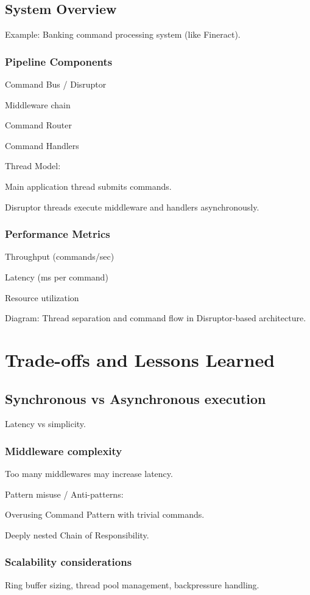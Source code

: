 \documentclass{article}
\begin{document}
\subsection{System Overview}
Example: Banking command processing system (like Fineract).

\subsubsection{Pipeline Components}

Command Bus / Disruptor

Middleware chain

Command Router

Command Handlers

Thread Model:

Main application thread submits commands.

Disruptor threads execute middleware and handlers asynchronously.

\subsubsection{Performance Metrics}

Throughput (commands/sec)

Latency (ms per command)

Resource utilization

Diagram: Thread separation and command flow in Disruptor-based architecture.

\section{Trade-offs and Lessons Learned}
\subsection{Synchronous vs Asynchronous execution}
Latency vs simplicity.

\subsubsection{Middleware complexity}
Too many middlewares may increase latency.

Pattern misuse / Anti-patterns:

Overusing Command Pattern with trivial commands.

Deeply nested Chain of Responsibility.

\subsubsection{Scalability considerations}
Ring buffer sizing, thread pool management, backpressure handling.
\end{document}
